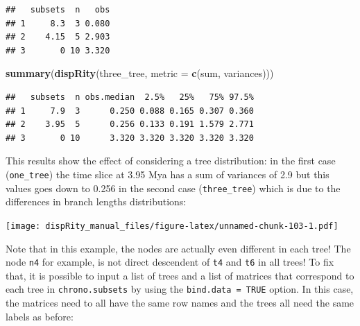 \documentclass[]{book}
\newenvironment{Shaded}{\begin{snugshade}}{\end{snugshade}}
\newcommand{\ControlFlowTok}[1]{\textcolor[rgb]{0.13,0.29,0.53}{\textbf{#1}}}
\newcommand{\DataTypeTok}[1]{\textcolor[rgb]{0.13,0.29,0.53}{#1}}
\newcommand{\DecValTok}[1]{\textcolor[rgb]{0.00,0.00,0.81}{#1}}
\newcommand{\FloatTok}[1]{\textcolor[rgb]{0.00,0.00,0.81}{#1}}
\newcommand{\KeywordTok}[1]{\textcolor[rgb]{0.13,0.29,0.53}{\textbf{#1}}}
\newcommand{\NormalTok}[1]{#1}
\newcommand{\OperatorTok}[1]{\textcolor[rgb]{0.81,0.36,0.00}{\textbf{#1}}}
\newcommand{\StringTok}[1]{\textcolor[rgb]{0.31,0.60,0.02}{#1}}
\begin{document}
\begin{verbatim}
##   subsets  n   obs
## 1     8.3  3 0.080
## 2    4.15  5 2.903
## 3       0 10 3.320
\end{verbatim}

\begin{Shaded}
\begin{Highlighting}[]
\KeywordTok{summary}\NormalTok{(}\KeywordTok{dispRity}\NormalTok{(three_tree, }\DataTypeTok{metric =} \KeywordTok{c}\NormalTok{(sum, variances)))}
\end{Highlighting}
\end{Shaded}

\begin{verbatim}
##   subsets  n obs.median  2.5%   25%   75% 97.5%
## 1     7.9  3      0.250 0.088 0.165 0.307 0.360
## 2    3.95  5      0.256 0.133 0.191 1.579 2.771
## 3       0 10      3.320 3.320 3.320 3.320 3.320
\end{verbatim}

This results show the effect of considering a tree distribution: in the first case (\texttt{one\_tree}) the time slice at 3.95 Mya has a sum of variances of 2.9 but this values goes down to 0.256 in the second case (\texttt{three\_tree}) which is due to the differences in branch lengths distributions:

\begin{Shaded}
\end{Shaded}

\texttt{[image: dispRity\_manual\_files/figure-latex/unnamed-chunk-103-1.pdf]}

Note that in this example, the nodes are actually even different in each tree! The node \texttt{n4} for example, is not direct descendent of \texttt{t4} and \texttt{t6} in all trees!
To fix that, it is possible to input a list of trees and a list of matrices that correspond to each tree in \texttt{chrono.subsets} by using the \texttt{bind.data\ =\ TRUE} option.
In this case, the matrices need to all have the same row names and the trees all need the same labels as before:
\end{document}
